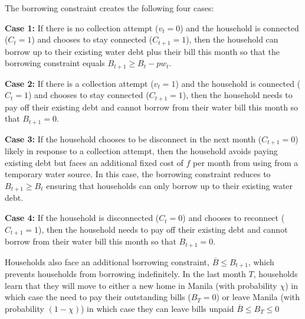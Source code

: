 \documentclass[12pt]{article}
\begin{document}
The borrowing constraint creates the following four cases:

\textbf{Case 1:} If there is no collection attempt ($v_t=0$) and the household is connected ($C_{t}=1$) and chooses to stay connected ($C_{t+1}=1$), then the household can borrow up to their existing water debt plus their bill this month so that the borrowing constraint equals $B_{t+1}\geq B_t -  p w_t $.

\textbf{Case 2:} If there is a collection attempt ($v_t=1$) and the household is connected ($C_t=1$) and chooses to stay connected ($C_{t+1}=1$), then the household needs to pay off their existing debt and cannot borrow from their water bill this month so that $B_{t+1} = 0$.

\textbf{Case 3:} If the household chooses to be disconnect in the next month ($C_{t+1}=0$) likely in response to a collection attempt, then the household avoids paying existing debt but faces an additional fixed cost of $f$ per month from using from a temporary water source.  In this case, the borrowing constraint reduces to $ B_{t+1} \geq B_t$ ensuring that households can only borrow up to their existing water debt.  

\textbf{Case 4:} If the household is disconnected ($C_t=0$) and chooses to reconnect ($C_{t+1}=1$), then the household needs to pay off their existing debt and cannot borrow from their water bill this month so that $B_{t+1} = 0$.  

Households also face an additional borrowing constraint, $\overline{B} \leq B_{t+1}$, which prevents households from borrowing indefinitely.  In the last month $T$, households learn that they will move to either a new home in Manila (with probability $\chi$) in which case the need to pay their outstanding bills ($B_T=0$) or leave Manila (with probability $(1-\chi)$) in which case they can leave bills unpaid $\overline{B}\leq B_T \leq0$
\end{document}
